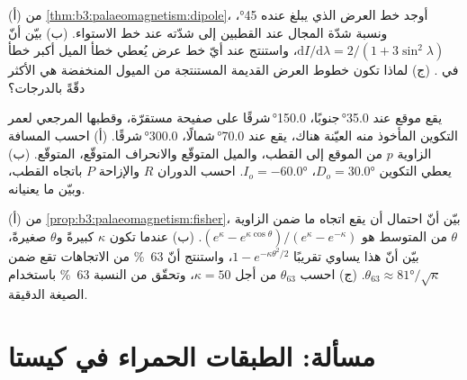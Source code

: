 \begin{exercise}[$\star\star\star$]\label{exo:b3:palaeomagnetism:10}
(أ) من \cref{thm:b3:palaeomagnetism:dipole}، أوجد خط العرض الذي يبلغ عنده  \ang{45}، ونسبة شدّة المجال عند القطبين إلى شدّته عند
خط الاستواء. (ب) بيّن أنّ $\mathrm dI/\mathrm d\lambda = 2/(1 + 3\sin^2\lambda)$،
واستنتج عند أيّ خط عرض يُعطي خطأ الميل أكبر خطأ
في . (ج) لماذا تكون خطوط العرض القديمة المستنتجة من الميول المنخفضة هي الأكثر
دقّةً بالدرجات؟
\end{exercise}

\begin{exercise}[$\star\star\star$]\label{exo:b3:palaeomagnetism:11}
يقع موقع عند \ang{35.0}\,جنوبًا، \ang{150.0}\,شرقًا على صفيحة مستقرّة، وقطبها المرجعي
لعمر التكوين المأخوذ منه العيّنة هناك، يقع عند \ang{70.0}\,شمالًا،
\ang{300.0}\,شرقًا. (أ) احسب المسافة الزاوية $p$ من الموقع إلى القطب،
والميل المتوقّع والانحراف المتوقّع،  المتوقّع.
(ب) يعطي التكوين $D_o = \ang{30.0}$، $I_o = \ang{-60.0}$. احسب
الدوران $R$ والإزاحة $P$ باتجاه القطب، وبيّن ما يعنيانه.
\end{exercise}

\begin{exercise}[$\star\star\star$]\label{exo:b3:palaeomagnetism:12}
(أ) من \cref{prop:b3:palaeomagnetism:fisher}، بيّن أنّ احتمال أن يقع اتجاه ما
ضمن الزاوية $\theta$ من المتوسط هو $(e^\kappa -
e^{\kappa\cos\theta})/(e^\kappa - e^{-\kappa})$. (ب) عندما تكون $\kappa$ كبيرةً
و$\theta$ صغيرةً، بيّن أنّ هذا يساوي تقريبًا $1 - e^{-\kappa\theta^2/2}$، واستنتج
أنّ \qty{63}{\percent} من الاتجاهات تقع ضمن $\theta_{63} \approx
\ang{81}/\sqrt\kappa$. (ج) احسب $\theta_{63}$ من أجل $\kappa = 50$، وتحقّق من
النسبة \qty{63}{\percent} باستخدام الصيغة الدقيقة.
\end{exercise}

\section{مسألة: الطبقات الحمراء في كيستا}

